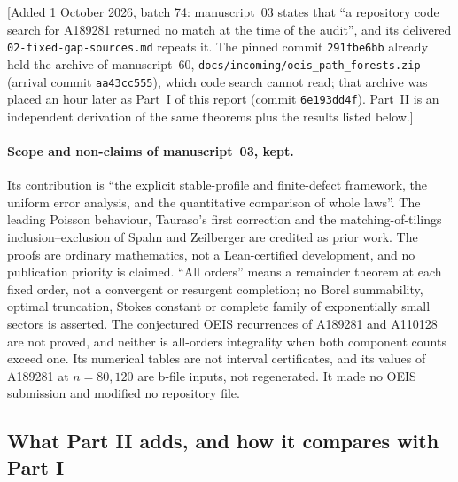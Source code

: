 \documentclass[11pt]{article}
\numberwithin{equation}{section}
\theoremstyle{definition}
\theoremstyle{remark}
\theoremstyle{definition}
\begin{document}
[Added 1 October 2026, batch 74: manuscript~03 states that ``a repository
code search for A189281 returned no match at the time of the audit'', and
its delivered \texttt{02-fixed-gap-sources.md} repeats it. The pinned
commit \texttt{291fbe6bb} already held the archive of manuscript~60,
\texttt{docs/incoming/oeis\_path\_forests.zip} (arrival commit
\texttt{aa43cc555}), which code search cannot read; that archive was placed
an hour later as Part~I of this report (commit \texttt{6e193dd4f}). Part~II
is an independent derivation of the same theorems plus the results listed
below.]

\paragraph{Scope and non-claims of manuscript~03, kept.} Its contribution
is ``the explicit stable-profile and finite-defect framework, the uniform
error analysis, and the quantitative comparison of whole laws''. The
leading Poisson behaviour, Tauraso's first correction and the
matching-of-tilings inclusion--exclusion of Spahn and Zeilberger are
credited as prior work. The proofs are ordinary mathematics, not a
Lean-certified development, and no publication priority is claimed. ``All
orders'' means a remainder theorem at each fixed order, not a convergent or
resurgent completion; no Borel summability, optimal truncation, Stokes
constant or complete family of exponentially small sectors is asserted. The
conjectured OEIS recurrences of A189281 and A110128 are not proved, and
neither is all-orders integrality when both component counts exceed one.
Its numerical tables are not interval certificates, and its values of
A189281 at $n=80,120$ are b-file inputs, not regenerated. It made no OEIS
submission and modified no repository file.

\subsection{What Part II adds, and how it compares with Part I}
\label{fga:sec:claims}
\end{document}
